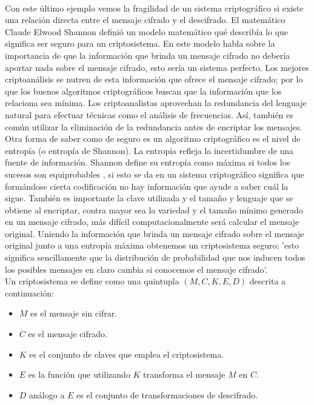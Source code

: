 \documentclass[../PFC.tex]{subfiles}
\begin{document}
\*
\vspace{0.5515cm}
\\
Con este último ejemplo vemos la fragilidad de un sistema criptográfico si existe una relación directa entre el mensaje cifrado y el descifrado. El matemático Claude Elwood Shannon definió un modelo matemático qué describía lo que significa ser seguro para un criptosistema\cite{bruce}. En este modelo habla sobre la importancia de que la información que brinda un mensaje cifrado no debería aportar nada sobre el mensaje cifrado, esto sería un sistema perfecto. Los mejores criptoanálisis se nutren de esta información que ofrece el mensaje cifrado; por lo que los buenos algoritmos criptográficos buscan que la información que los relaciona sea mínima. Los criptoanalistas aprovechan la redundancia del lenguaje natural para efectuar técnicas como el análisis de frecuencias. Así, también es común utilizar la eliminación de la redundancia antes de encriptar los mensajes.
\*
\vspace{0.5515cm}
\\
Otra forma de saber como de seguro es un algoritmo criptográfico es el nivel de entropía (o entropía de Shannon). La entropía refleja la incertidumbre de una fuente de información. Shannon define su entropía como máxima si todos los sucesos son equiprobables \cite{shannon2001mathematical}, si esto se da en un sistema criptográfico significa que formándose cierta codificación no hay información que ayude a saber cuál la sigue. También es importante la clave utilizada y el tamaño y lenguaje que se obtiene al encriptar, contra mayor sea la variedad y el tamaño mínimo generado en un mensaje cifrado, más difícil computacionalmente será calcular el mensaje original. Uniendo la información que brinda un mensaje cifrado sobre el mensaje original junto a una entropía máxima obtenemos un criptosistema seguro; 'esto significa sencillamente que la distribución de probabilidad que nos inducen todos los posibles mensajes en claro cambia si conocemos el mensaje cifrado'\cite{lucena}.
\*
\vspace{0.5515cm}
\\
Un criptosistema se define como una quintupla $(M,C,K,E,D)$ descrita a continuación\cite{lucena}:

\begin{itemize}
\item{$M$ es el mensaje sin cifrar.}
\item{$C$ es el mensaje cifrado.}
\item{$K$ es el conjunto de claves que emplea el criptosistema.}
\item{$E$ es la función que utilizando $K$ transforma el mensaje $M$ en $C$.}
\item{$D$ análogo a $E$ es el conjunto de transformaciones de descifrado.}
\end{itemize}
\end{document}
